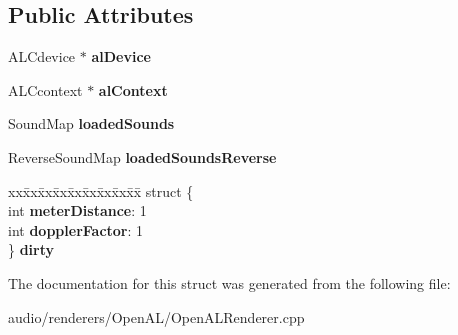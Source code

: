 \subsection*{Public Attributes}
\begin{DoxyCompactItemize}
\item 
A\+L\+Cdevice $\ast$ {\bfseries al\+Device}\hypertarget{structAudio_1_1____impl_1_1OpenAL_1_1RendererData_a3e395bffd611bf1a79e62b997c8631f7}{}\label{structAudio_1_1____impl_1_1OpenAL_1_1RendererData_a3e395bffd611bf1a79e62b997c8631f7}

\item 
A\+L\+Ccontext $\ast$ {\bfseries al\+Context}\hypertarget{structAudio_1_1____impl_1_1OpenAL_1_1RendererData_a1962eef8e1eeadac4e98de9d96f26bcb}{}\label{structAudio_1_1____impl_1_1OpenAL_1_1RendererData_a1962eef8e1eeadac4e98de9d96f26bcb}

\item 
Sound\+Map {\bfseries loaded\+Sounds}\hypertarget{structAudio_1_1____impl_1_1OpenAL_1_1RendererData_a5bb809a40a2cff0482e3c4068535bdfd}{}\label{structAudio_1_1____impl_1_1OpenAL_1_1RendererData_a5bb809a40a2cff0482e3c4068535bdfd}

\item 
Reverse\+Sound\+Map {\bfseries loaded\+Sounds\+Reverse}\hypertarget{structAudio_1_1____impl_1_1OpenAL_1_1RendererData_acddb4a84ead72c77f1b3d00e3e47b29f}{}\label{structAudio_1_1____impl_1_1OpenAL_1_1RendererData_acddb4a84ead72c77f1b3d00e3e47b29f}

\item 
\begin{tabbing}
xx\=xx\=xx\=xx\=xx\=xx\=xx\=xx\=xx\=\kill
struct \{\\
\>int {\bfseries meterDistance}: 1\\
\>int {\bfseries dopplerFactor}: 1\\
\} {\bfseries dirty}\hypertarget{structAudio_1_1____impl_1_1OpenAL_1_1RendererData_a783b92810000b8734eb04bba1fef5315}{}\label{structAudio_1_1____impl_1_1OpenAL_1_1RendererData_a783b92810000b8734eb04bba1fef5315}
\\

\end{tabbing}\end{DoxyCompactItemize}


The documentation for this struct was generated from the following file\+:\begin{DoxyCompactItemize}
\item 
audio/renderers/\+Open\+A\+L/Open\+A\+L\+Renderer.\+cpp\end{DoxyCompactItemize}
